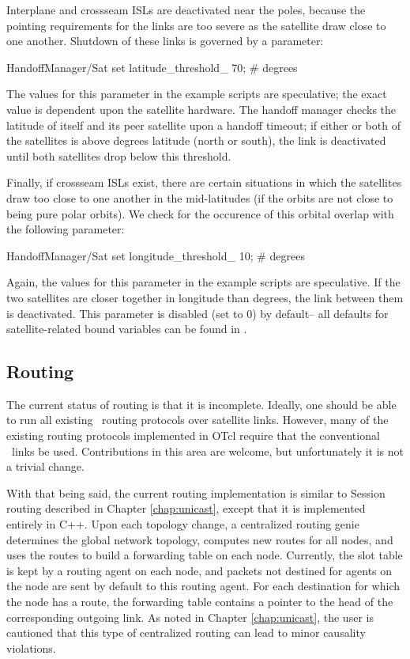 Interplane and crossseam ISLs are deactivated near the poles, because 
the pointing requirements for the links are too severe as the satellite
draw close to one another.  Shutdown of these links is governed by a parameter:
\begin{program}
HandoffManager/Sat set latitude_threshold_ 70; # degrees 
\end{program}
The values for this parameter in the example scripts are speculative;
the exact value is dependent upon the satellite hardware.  The handoff
manager checks the latitude of itself and its peer satellite upon a handoff
timeout; if either or both of the satellites is above 
 degrees latitude (north or south), the link
is deactivated until both satellites drop below this threshold.

Finally, if crossseam ISLs exist, there are certain situations in which
the satellites draw too close to one another in the mid-latitudes (if
the orbits are not close to being pure polar orbits).  We check for
the occurence of this orbital overlap with the following parameter:
\begin{program}
HandoffManager/Sat set longitude_threshold_ 10; # degrees 
\end{program}
Again, the values for this parameter in the example scripts are speculative.
If the two satellites are closer together in longitude than 
 degrees, the link between them is deactivated.
This parameter is disabled (set to $0$) by default-- all defaults for
satellite-related bound variables can be found in .



\subsection{Routing }
\label{sec:satellite/usage/routing}

The current status of routing is that it is incomplete.  Ideally, one should
be able to run all existing \ns~routing protocols over satellite links.  
However,
many of the existing routing protocols implemented in OTcl require that
the conventional \ns~links be used.  Contributions in this area are welcome,
but unfortunately it is not a trivial change.

With that being said, the current routing implementation is similar to
Session routing described in Chapter \ref{chap:unicast}, except that it
is implemented entirely in C++.   Upon each topology change, a centralized
routing genie determines the global network topology, computes new routes
for all nodes, and uses the routes to build
a forwarding table on each node.  Currently,
the slot table is kept by a routing agent on each node, and packets 
not destined for agents on the node are sent by default to this routing 
agent.  For each destination for which the node has a route, the forwarding
table contains a pointer to the head of the corresponding outgoing link.
As noted in Chapter \ref{chap:unicast}, the user is cautioned that this type 
of centralized routing can lead to minor causality violations.

